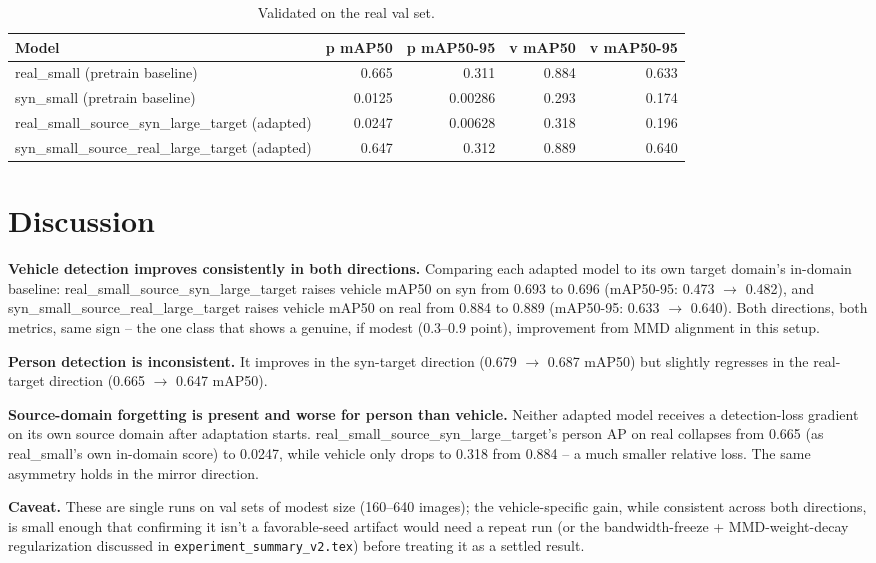\documentclass[11pt]{article}
\begin{document}
\begin{table}[h!]
    \centering
    \begin{tabular}{lrrrr}
        \toprule
        Model & p mAP50 & p mAP50-95 & v mAP50 & v mAP50-95 \\
        \midrule
        real\_small (pretrain baseline) & 0.665 & 0.311 & 0.884 & 0.633 \\
        syn\_small (pretrain baseline) & 0.0125 & 0.00286 & 0.293 & 0.174 \\
        real\_small\_source\_syn\_large\_target (adapted) & 0.0247 & 0.00628 & 0.318 & 0.196 \\
        syn\_small\_source\_real\_large\_target (adapted) & 0.647 & 0.312 & 0.889 & 0.640 \\
        \bottomrule
    \end{tabular}
    \caption{Validated on the real val set.}
\end{table}

\section{Discussion}

\textbf{Vehicle detection improves consistently in both directions.} Comparing each
adapted model to its own target domain's in-domain baseline: real\_small\_source\_syn\_large\_target
raises vehicle mAP50 on syn from 0.693 to 0.696 (mAP50-95: 0.473 $\to$ 0.482), and
syn\_small\_source\_real\_large\_target raises vehicle mAP50 on real from 0.884 to 0.889
(mAP50-95: 0.633 $\to$ 0.640). Both directions, both metrics, same sign -- the one class
that shows a genuine, if modest (0.3--0.9 point), improvement from MMD alignment in this
setup.

\textbf{Person detection is inconsistent.} It improves in the syn-target direction
(0.679 $\to$ 0.687 mAP50) but slightly regresses in the real-target direction
(0.665 $\to$ 0.647 mAP50).

\textbf{Source-domain forgetting is present and worse for person than vehicle.} Neither
adapted model receives a detection-loss gradient on its own source domain after
adaptation starts. real\_small\_source\_syn\_large\_target's person AP on real collapses
from 0.665 (as real\_small's own in-domain score) to 0.0247, while vehicle only drops to
0.318 from 0.884 -- a much smaller relative loss. The same asymmetry holds in the mirror
direction.

\textbf{Caveat.} These are single runs on val sets of modest size (160--640 images);
the vehicle-specific gain, while consistent across both directions, is small enough that
confirming it isn't a favorable-seed artifact would need a repeat run (or the
bandwidth-freeze + MMD-weight-decay regularization discussed in
\texttt{experiment\_summary\_v2.tex}) before treating it as a settled result.
\end{document}
